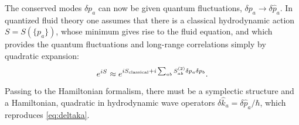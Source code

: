 \documentclass[twocolumn,amsfonts,showpacs,superscriptaddress]{revtex4-1}
\begin{document}
\vspace{0.1cm} \; The conserved modes $\delta p_a$ can now be given quantum fluctuations, $\delta p_a\rightarrow \delta\hat p_a$. In quantized fluid theory one assumes that there is a classical hydrodynamic action $S = S(\{p_a\})$, whose minimum gives rise to the fluid equation, and which provides the quantum fluctuations and long-range correlations simply by quadratic expansion:
\begin{equation}
	e^{iS} \approx e^{iS_{\rm classical} + i\sum_{ab} S^{(2)}_{ab} \delta p_a \delta p_{b} }.
\end{equation}
Passing to the Hamiltonian formalism, there must be a symplectic structure and a Hamiltonian, quadratic in hydrodynamic wave operators $\delta \hat k_a=\delta \hat p_a/\hbar$, which reproduces \eqref{eq:deltaka}.
\end{document}
